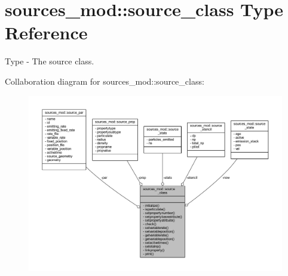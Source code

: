 \hypertarget{structsources__mod_1_1source__class}{}\section{sources\+\_\+mod\+:\+:source\+\_\+class Type Reference}
\label{structsources__mod_1_1source__class}


Type -\/ The source class.  




Collaboration diagram for sources\+\_\+mod\+:\+:source\+\_\+class\+:\nopagebreak
\begin{figure}[H]
\begin{center}
\leavevmode
\includegraphics[width=350pt]{structsources__mod_1_1source__class__coll__graph}
\end{center}
\end{figure}
